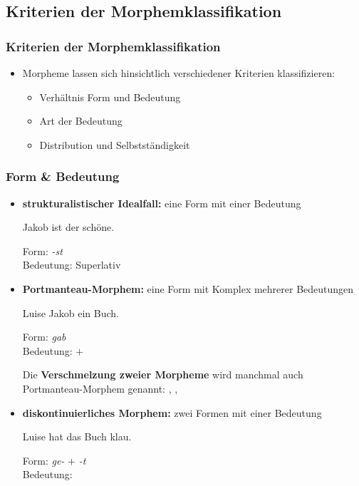 \subsection{Kriterien der Morphemklassifikation}
\frame{
\frametitle{~}
	\tableofcontents[currentsection]
}


\begin{frame}
\frametitle{Kriterien der Morphemklassifikation}

\begin{itemize}
	\item Morpheme lassen sich hinsichtlich verschiedener Kriterien klassifizieren:
	
	\begin{itemize}
	 \item Verhältnis Form und Bedeutung
	 \item Art der Bedeutung
	 \item Distribution und Selbstständigkeit
	\end{itemize}
\end{itemize}


\end{frame}



\begin{frame}
\frametitle{Form \& Bedeutung}

\begin{itemize}
	\item \textbf{strukturalistischer Idealfall:} eine Form mit einer Bedeutung
	
	\ea	Jakob ist der schöne.
	
	Form: \emph{-st} \\
	Bedeutung: Superlativ
	\z

\pause 
	
	\item \textbf{Portmanteau-Morphem:}  eine Form mit Komplex mehrerer Bedeutungen
	
	\ea Luise  Jakob ein Buch.
	
	Form: \emph{gab} \\
	Bedeutung:  $+$ 
	\z
	
	Die \textbf{Verschmelzung zweier Morpheme} wird manchmal auch Portmanteau-Morphem genannt: , , 

\pause 
	
	\item \textbf{diskontinuierliches Morphem:} zwei Formen mit einer Bedeutung 
	
	\ea Luise hat das Buch klau.
	
	Form: \emph{ge-} $+$ \emph{-t} \\
	Bedeutung:  \\

	\z	

\end{itemize}

\end{frame}


